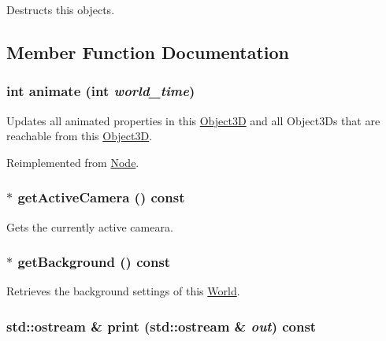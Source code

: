 Destructs this objects. 

\subsection{Member Function Documentation}
\hypertarget{classm3g_1_1World_8aad1ceab4c2a03609c8a42324ce484d}{
\subsubsection[{animate}]{\setlength{\rightskip}{0pt plus 5cm}int animate (int {\em world\_\-time})}}
\label{classm3g_1_1World_8aad1ceab4c2a03609c8a42324ce484d}


Updates all animated properties in this \hyperlink{classm3g_1_1Object3D}{Object3D} and all Object3Ds that are reachable from this \hyperlink{classm3g_1_1Object3D}{Object3D}. 

Reimplemented from \hyperlink{classm3g_1_1Node_8aad1ceab4c2a03609c8a42324ce484d}{Node}.\hypertarget{classm3g_1_1World_812e01ec4fd0fd872b0ca5ea6a30b2f6}{
\subsubsection[{getActiveCamera}]{ $\ast$ getActiveCamera () const}}
\label{classm3g_1_1World_812e01ec4fd0fd872b0ca5ea6a30b2f6}


Gets the currently active cameara. \hypertarget{classm3g_1_1World_fb10ab7fd2ad14b7b1d49caf129670e0}{
\subsubsection[{getBackground}]{ $\ast$ getBackground () const}}
\label{classm3g_1_1World_fb10ab7fd2ad14b7b1d49caf129670e0}


Retrieves the background settings of this \hyperlink{classm3g_1_1World}{World}. \hypertarget{classm3g_1_1World_6fea17fa1532df3794f8cb39cb4f911f}{
\subsubsection[{print}]{\setlength{\rightskip}{0pt plus 5cm}std::ostream \& print (std::ostream \& {\em out}) const}}
\label{classm3g_1_1World_6fea17fa1532df3794f8cb39cb4f911f}


